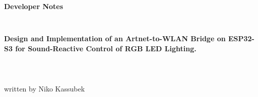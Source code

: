 \thispagestyle{empty}
\begin{verbatim}


\end{verbatim}

\begin{center}
\huge{\textbf{Developer Notes}}
\end{center}

\begin{verbatim}


\end{verbatim}

\begin{center}
	\textbf{\large Design and Implementation of an Artnet-to-WLAN Bridge on ESP32-S3 for Sound-Reactive Control of RGB LED Lighting.}
\end{center}


\begin{verbatim}
	
	
\end{verbatim}
\begin{center}
	written by Niko Kassubek
\end{center}
